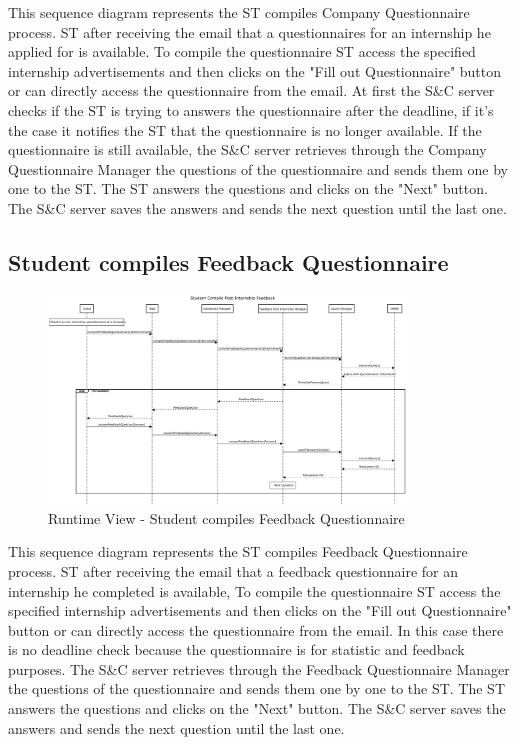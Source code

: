 \par This sequence diagram represents the ST compiles Company Questionnaire process. ST after receiving the email that
a questionnaires for an internship he applied for is available. To compile the questionnaire ST access the specified internship
advertisements and then clicks on the "Fill out Questionnaire" button or can directly access the questionnaire from the email.
At first the S\&C server checks if the ST is trying to answers the questionnaire after the deadline, if it's the case it notifies
the ST that the questionnaire is no longer available. If the questionnaire is still available, the S\&C server retrieves through
the Company Questionnaire Manager the questions of the questionnaire and sends them one by one to the ST.
The ST answers the questions and clicks on the "Next" button. The S\&C server saves the answers and sends the next question
until the last one.

\subsection{Student compiles Feedback Questionnaire}
\label{sub:student-compiles-feedback-questionnaire}%

\begin{figure}[H]
      \centering
      \includegraphics[width=0.85\textwidth]{Images/RV_04b.pdf}
      \caption{Runtime View - Student compiles Feedback Questionnaire}
      \label{fig:rv-student-compiles-feedback-questionnaire}
\end{figure}

\par This sequence diagram represents the ST compiles Feedback Questionnaire process. ST after receiving the email that
a feedback questionnaire for an internship he completed is available, To compile the questionnaire ST access the specified internship
advertisements and then clicks on the "Fill out Questionnaire" button or can directly access the questionnaire from the email.
In this case there is no deadline check because the questionnaire is for statistic and feedback purposes. The S\&C server retrieves
through the Feedback Questionnaire Manager the questions of the questionnaire and sends them one by one to the ST.
The ST answers the questions and clicks on the "Next" button. The S\&C server saves the answers and sends the next question
until the last one.

